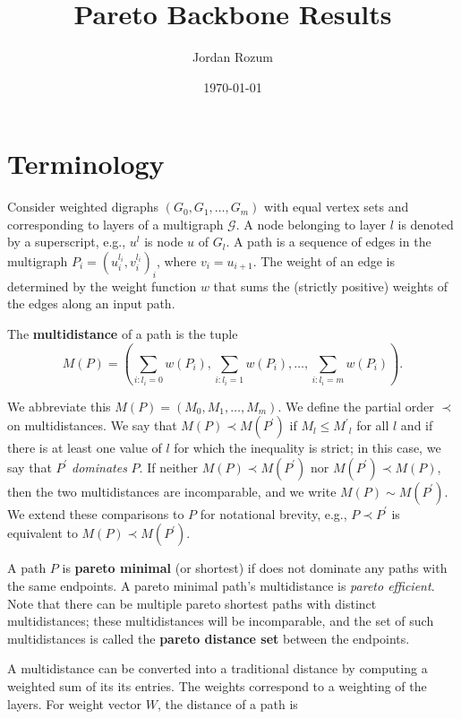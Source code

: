 \documentclass{article}
\title{Pareto Backbone Results}
\author{Jordan Rozum}
\date{\today} %
\begin{document}
\maketitle %

\section{Terminology} %

Consider weighted digraphs $\left(G_0,G_1,\ldots,G_m\right)$ with equal vertex sets and corresponding
to layers of a multigraph $\mathcal{G}$. A node belonging to layer $l$ is denoted by a superscript, e.g.,
$u^l$ is
node $u$ of $G_l$. A path is a sequence of edges in the multigraph $P_i={(u_i^{l_i},v_i^{l_i})}_i$,
where $v_i=u_{i+1}$. The weight of an edge is determined by the weight function $w$ that sums the
(strictly positive) weights of the edges along an input path.

The {\bf multidistance} of a path is the tuple
\[M(P)=\left(\sum_{i:l_i=0} w(P_i),\sum_{i:l_i=1} w(P_i),\ldots,\sum_{i:l_i=m} w(P_i)\right).\]

We abbreviate this $M(P)=(M_0,M_1,\ldots,M_m)$. We define the partial order $\prec$
on multidistances. We say that $M(P)\prec M(P^\prime)$ if $M_l\leq {M^\prime}_l$ for all $l$ and if
there is at least one value of $l$ for which the inequality is strict; in this case, we say that
$P^\prime$ \emph{dominates} $P$. If neither
$M(P)\prec M(P^\prime)$ nor $M(P^\prime)\prec M(P)$, then the two multidistances are incomparable, and
we write $M(P)\sim M(P^\prime)$. We extend these comparisons to $P$ for notational brevity, e.g.,
$P\prec P^\prime$ is equivalent to $M(P)\prec M(P^\prime)$.

A path $P$ is {\bf pareto minimal} (or shortest) if does not dominate any paths with the same
endpoints. A pareto minimal path's multidistance is \emph{pareto efficient}. Note that there can be
multiple pareto shortest paths with distinct multidistances; these
multidistances will be incomparable, and the set of such multidistances is called the {\bf pareto distance
        set} between the endpoints.

A multidistance can be converted into a traditional distance by computing a weighted sum of its
its entries. The weights correspond to a weighting of the layers. For weight vector $W$,
the distance of a path is
\end{document}
